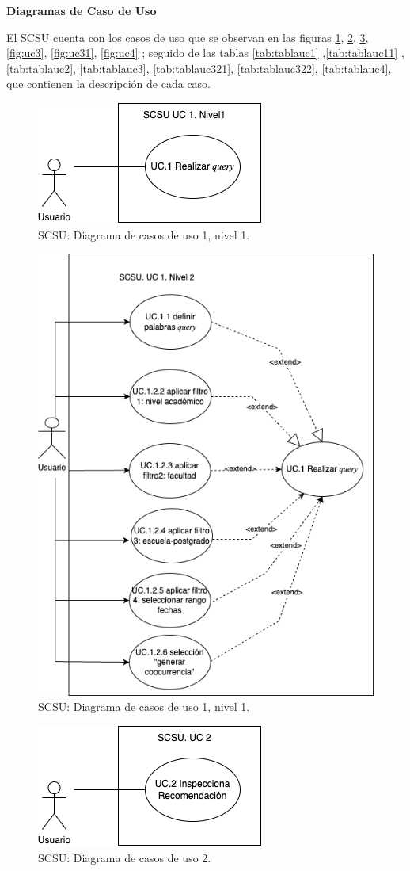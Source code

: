 \documentclass[
  12pt,
  openany]{book}
\begin{document}
\textbf{Diagramas de Caso de Uso}

El SCSU cuenta con los casos de uso que se observan en las figuras \ref{fig:uc1}, \ref{fig:uc12}, \ref{fig:uc2}, \ref{fig:uc3}, \ref{fig:uc31}, \ref{fig:uc4} ; seguido de las tablas \ref{tab:tablauc1} ,\ref{tab:tablauc11} , \ref{tab:tablauc2}, \ref{tab:tablauc3}, \ref{tab:tablauc321}, \ref{tab:tablauc322}, \ref{tab:tablauc4}, que contienen la descripción de cada caso.

\begin{figure}

{\centering \includegraphics[width=0.4\linewidth]{images/05-desarrollo/4_ciclo/UC/SCSU_UC1_nivel1} 

}

\caption{SCSU: Diagrama de casos de uso 1, nivel 1.}\label{fig:uc1}
\end{figure}

\begin{figure}

{\centering \includegraphics[width=0.5\linewidth]{images/05-desarrollo/4_ciclo/UC/SCSU_UC1_nivel2} 

}

\caption{SCSU: Diagrama de casos de uso 1, nivel 1.}\label{fig:uc12}
\end{figure}

\begin{figure}

{\centering \includegraphics[width=0.4\linewidth]{images/05-desarrollo/4_ciclo/UC/SCSU_UC2_nivel1} 

}

\caption{SCSU: Diagrama de casos de uso 2.}\label{fig:uc2}
\end{figure}
\end{document}
